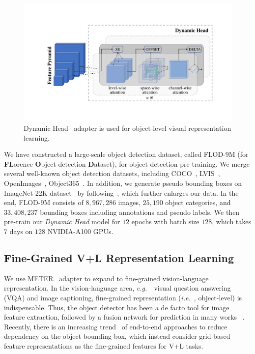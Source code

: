 \documentclass{article}
\newcommand{\eg}{{\it{e.g.}~}}
\newcommand{\ie}{{\it{i.e.}~}}
\begin{document}
\begin{figure}[t]
  \centering
   \includegraphics[width=1.0\linewidth]{figure/dyhead.pdf}
  \caption{Dynamic Head~\cite{Dai_2021_CVPR} adapter is used for object-level visual representation learning.}
  \label{fig:dyhead}
\end{figure}


We have constructed a large-scale object detection dataset, called FLOD-9M (for {\bf{FL}}orence {\bf{O}}bject detection {\bf{D}}ataset), for object detection
pre-training. We merge several well-known object detection datasets, including
COCO~\cite{lin2015microsoft}, LVIS~\cite{Gupta_2019_CVPR}, OpenImages~\cite{openimages},
Object365~\cite{Shao_2019_ICCV}. In addition, we generate pseudo bounding boxes on ImageNet-22K
dataset~\cite{deng2009imagenet} by following~\cite{ZophGLCLC020_nips}, which further enlarges our
data. In the end, FLOD-9M consists of $8,967,286$ images, $25,190$ object categories, and
$33,408,237$ bounding boxes including annotations and pseudo labels. We then pre-train our
\emph{Dynamic Head} model for $12$ epochs with batch size $128$, which takes $7$ days on $128$
NVIDIA-A100 GPUs.


\subsection{Fine-Grained V+L Representation Learning}

We use METER~\cite{dou2021empirical} adapter to expand to fine-grained vision-language representation. In the vision-language area, \eg ~visual question answering (VQA) and image captioning, fine-grained representation (\ie, object-level) is indispensable. Thus, the object detector has been a de facto tool for image feature extraction,
followed by a fusion network for prediction in many works ~\cite{00010BT0GZ18,li:oscar,Zhang_2021_CVPR,abs-2012-06946,abs-2104-02096,chen:uniter}.
Recently, there is an increasing trend~\cite{abs-2104-03135,xue2021probing,wang2021simvlm,KimSK21,dou2021empirical} of end-to-end approaches to reduce dependency on the object bounding box, which instead consider grid-based feature representations as the fine-grained features for V+L tasks.
\end{document}
